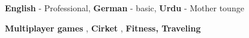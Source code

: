 \documentclass[9pt]{developercv}
\begin{document}
\begin{entrylist}
{\begin{itemize}[noitemsep,topsep=0pt,parsep=0pt,partopsep=0pt, leftmargin=-1pt]




        \end{itemize}
    }

\end{entrylist}

\vspace{-10 pt}
\vspace{-6pt}

\hspace{26mm} \textbf{English} - Professional, \textbf{ German} - basic, \textbf{ Urdu} - Mother tounge



\vspace{-10 pt}
\vspace{-6pt}

\hspace{26mm} \textbf{Multiplayer games} , \textbf{ Cirket} , \textbf{ Fitness, Traveling}

\end{document}
